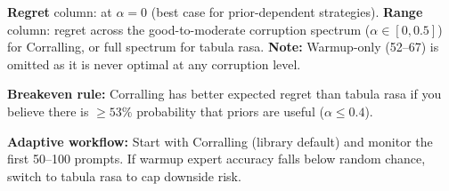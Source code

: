 \begin{table}[t]
\vspace{0.5em}
\small
\textbf{Regret} column: at $\alpha{=}0$ (best case for prior-dependent strategies).
\textbf{Range} column: regret across the good-to-moderate corruption
spectrum ($\alpha \in [0, 0.5]$) for Corralling, or full spectrum for
tabula rasa.
\textbf{Note:} Warmup-only (52--67) is omitted as it is never optimal at
any corruption level.

\textbf{Breakeven rule:}
Corralling has better expected regret than tabula rasa if you believe
there is $\geq 53\%$ probability that priors are useful ($\alpha \leq 0.4$).

\textbf{Adaptive workflow:}
Start with Corralling (library default) and monitor the first 50--100
prompts.  If warmup expert accuracy falls below random chance, switch to
tabula rasa to cap downside risk.
\end{table}
